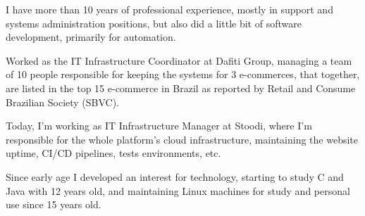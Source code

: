 

\begin{cvparagraph}
{I have more than 10 years of professional experience, mostly in support and 
systems administration positions, but also did a little bit of software development,
primarily for automation.

Worked as the IT Infrastructure Coordinator at Dafiti Group, managing a team of 
10 people responsible for keeping the systems for 3 e-commerces, that together, 
are listed in the top 15 e-commerce in Brazil as reported by Retail and Consume 
Brazilian Society (SBVC).

Today, I'm working as IT Infrastructure Manager at Stoodi, where I'm responsible
for the whole platform's cloud infrastructure, maintaining the website uptime,
CI/CD pipelines, tests environments, etc.

Since early age I developed an interest for technology, starting to study C and 
Java with 12 years old, and maintaining Linux machines for study and personal 
use since 15 years old.}

\end{cvparagraph}
